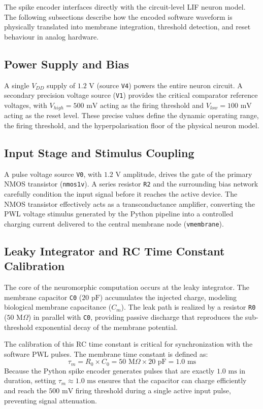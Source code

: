 The spike encoder interfaces directly with the circuit-level LIF neuron model. The following subsections describe how the encoded software waveform is physically translated into membrane integration, threshold detection, and reset behaviour in analog hardware.

\subsection{Power Supply and Bias}
A single $V_{DD}$ supply of $1.2\text{ V}$ (source \texttt{V4}) powers the entire neuron circuit. A secondary precision voltage source (\texttt{V1}) provides the critical comparator reference voltages, with $V_{high} = 500\text{ mV}$ acting as the firing threshold and $V_{low} = 100\text{ mV}$ acting as the reset level. These precise values define the dynamic operating range, the firing threshold, and the hyperpolarisation floor of the physical neuron model.

\subsection{Input Stage and Stimulus Coupling}
A pulse voltage source \texttt{V0}, with $1.2\text{ V}$ amplitude, drives the gate of the primary NMOS transistor (\texttt{nmos1v}). A series resistor \texttt{R2} and the surrounding bias network carefully condition the input signal before it reaches the active device. The NMOS transistor effectively acts as a transconductance amplifier, converting the PWL voltage stimulus generated by the Python pipeline into a controlled charging current delivered to the central membrane node (\texttt{vmembrane}).

\subsection{Leaky Integrator and RC Time Constant Calibration}
The core of the neuromorphic computation occurs at the leaky integrator. The membrane capacitor \texttt{C0} ($20\text{ pF}$) accumulates the injected charge, modeling biological membrane capacitance ($C_m$). The leak path is realized by a resistor \texttt{R0} ($50\text{ M}\Omega$) in parallel with \texttt{C0}, providing passive discharge that reproduces the sub-threshold exponential decay of the membrane potential. 

The calibration of this RC time constant is critical for synchronization with the software PWL pulses. The membrane time constant is defined as:
\begin{equation}
\tau_m = R_0 \times C_0 = 50\text{ M}\Omega \times 20\text{ pF} = 1.0\text{ ms}
\end{equation}
Because the Python spike encoder generates pulses that are exactly $1.0\text{ ms}$ in duration, setting $\tau_m \approx 1.0\text{ ms}$ ensures that the capacitor can charge efficiently and reach the $500\text{ mV}$ firing threshold during a single active input pulse, preventing signal attenuation.

